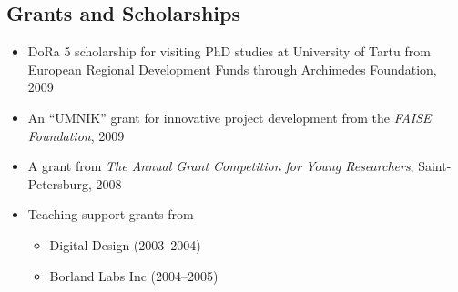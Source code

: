 \documentclass[a4paper, 12pt]{article}
\begin{document}
\subsection*{Grants and Scholarships}
\begin{itemize}
	\item DoRa 5 scholarship for visiting PhD studies at University of Tartu from European Regional Development Funds through Archimedes Foundation, 2009
	\item An ``UMNIK'' grant for innovative project development from the {\it FAISE Foundation}, 2009
	\item A grant from {\it The Annual Grant Competition for Young Researchers}, Saint-Petersburg, 2008
	\item {Teaching support grants from 
		\begin{itemize}
			\item Digital Design (2003--2004)  
			\item Borland Labs Inc (2004--2005) 
		\end{itemize}}
\end{itemize}
\end{document}
